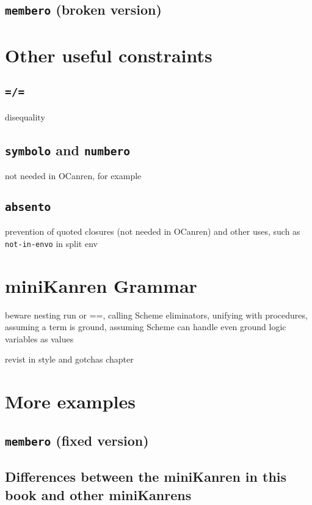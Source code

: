 \documentclass{book}
\begin{document}
\subsection{\texttt{membero} (broken version)}

\section{Other useful constraints}

\subsection{\texttt{=/=}}

disequality

\subsection{\texttt{symbolo} and \texttt{numbero}}

not needed in OCanren, for example

\subsection{\texttt{absento}}

prevention of quoted closures (not needed in OCanren) and other uses,
such as \texttt{not-in-envo} in split env

\section{miniKanren Grammar}

beware nesting run or ==, calling Scheme eliminators, unifying with procedures, assuming a term is ground, assuming Scheme can handle even ground logic variables as values

revist in style and gotchas chapter

\section{More examples}

\subsection{\texttt{membero} (fixed version)}

\subsection{Differences between the miniKanren in this book and other miniKanrens}
\end{document}
